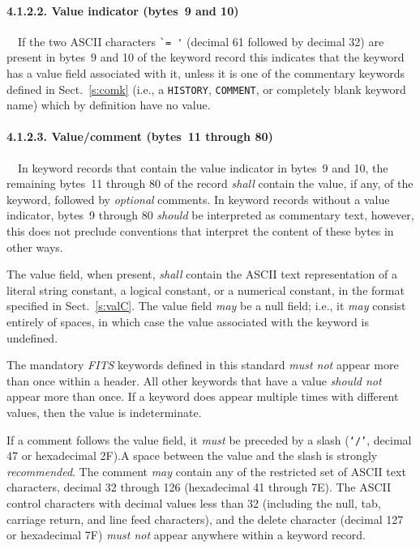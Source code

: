 \documentclass[onecolumn]{aa}
\begin{document}
   \paragraph{4.1.2.2. Value indicator (bytes~9 and 10)}
   \label{s:ValInd}
\ \newline \ \newline   If the two ASCII characters \verb*+`= '+ (decimal 61 followed by decimal 32) 
   are present in bytes~9 and 10 of the
   keyword record this indicates that the keyword has a value field associated
   with it, unless it is one of the commentary 
   keywords defined in Sect.\ \ref{s:comk} 
   (i.e., a {\tt HISTORY}, {\tt COMMENT},
   or completely blank keyword name) which by definition have no value.  

   \paragraph{4.1.2.3. Value/comment (bytes~11 through 80)}
   \label{s:valcomm}
\ \newline \ \newline   In keyword records that contain the value indicator in bytes~9 and 10, the
   remaining bytes~11 through 80 of the record {\em shall} contain the value,
   if any, of the keyword, followed by {\em optional} comments.   In keyword
   records without a value indicator, bytes~9 through 80 {\em should} be
   interpreted as commentary text, however, this does not preclude conventions
   that interpret the content of these bytes in other ways.

   The value field, when present, {\em shall} contain the ASCII text
   representation  of a literal string constant, a logical constant, or a
   numerical constant, in the format specified in Sect.\ \ref{s:valC}.   The value
   field {\em may} be a null field; i.e., it {\em may} consist entirely of
   spaces, in which case the  value associated with the keyword is undefined.

   The mandatory {\em FITS} keywords defined in this standard
   {\em must not} appear more than once within a header.
   All other keywords that have a value {\em should not} appear more than once.
   If a keyword does appear multiple times
   with different values, then the value is indeterminate.

   If a comment follows the value field, it {\em must} be preceded by a slash
   ({\tt `/'}, decimal 47 or hexadecimal 2F).\footnotemark[1]
   A space between the value and the
   slash is strongly {\em recommended}.  The comment {\em may}
   contain any of the restricted set of ASCII text characters,
   decimal 32 through 126 (hexadecimal
   41 through 7E).  The ASCII control
   characters with decimal values less than 32 (including the null, tab,
   carriage return, and line feed characters), and the delete character
   (decimal 127 or hexadecimal 7F) {\em must not} appear anywhere within 
   a keyword record.  
\end{document}

